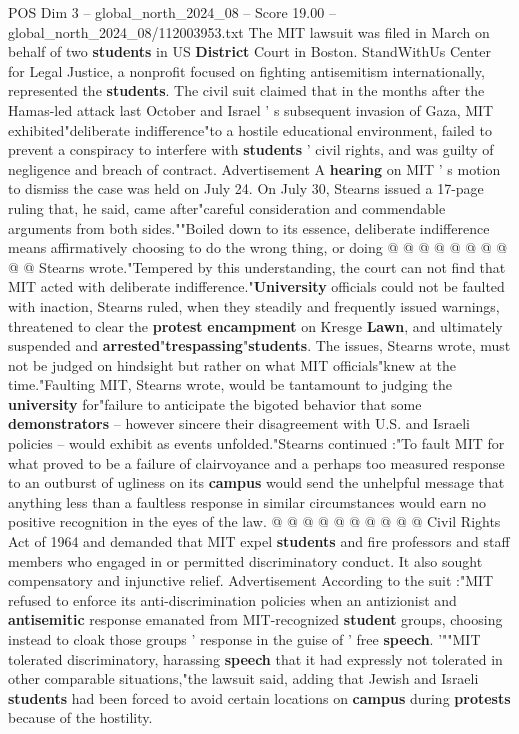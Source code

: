 \begin{textsample}{POS Dim 3 – global\_north\_2024\_08 – Score 19.00 – global\_north\_2024\_08/112003953.txt}
The MIT lawsuit was filed in March on behalf of two \textbf{students} in US \textbf{District} Court in Boston.
StandWithUs Center for Legal Justice, a nonprofit focused on fighting antisemitism internationally, represented the \textbf{students}.
The civil suit claimed that in the months after the Hamas-led attack last October and Israel ' s subsequent invasion of Gaza, MIT exhibited"deliberate indifference"to a hostile educational environment, failed to prevent a conspiracy to interfere with \textbf{students} ' civil rights, and was guilty of negligence and breach of contract.
Advertisement A \textbf{hearing} on MIT ' s motion to dismiss the case was held on July 24.
On July 30, Stearns issued a 17-page ruling that, he said, came after"careful consideration and commendable arguments from both sides.""Boiled down to its essence, deliberate indifference means affirmatively choosing to do the wrong thing, or doing @ @ @ @ @ @ @ @ @ @ Stearns wrote."Tempered by this understanding, the court can not find that MIT acted with deliberate indifference."\textbf{University} officials could not be faulted with inaction, Stearns ruled, when they steadily and frequently issued warnings, threatened to clear the \textbf{protest} \textbf{encampment} on Kresge \textbf{Lawn}, and ultimately suspended and \textbf{arrested}"\textbf{trespassing}"\textbf{students}.
The issues, Stearns wrote, must not be judged on hindsight but rather on what MIT officials"knew at the time."Faulting MIT, Stearns wrote, would be tantamount to judging the \textbf{university} for"failure to anticipate the bigoted behavior that some \textbf{demonstrators} -- however sincere their disagreement with U.S. and Israeli policies -- would exhibit as events unfolded."Stearns continued :"To fault MIT for what proved to be a failure of clairvoyance and a perhaps too measured response to an outburst of ugliness on its \textbf{campus} would send the unhelpful message that anything less than a faultless response in similar circumstances would earn no positive recognition in the eyes of the law. @ @ @ @ @ @ @ @ @ @ Civil Rights Act of 1964 and demanded that MIT expel \textbf{students} and fire professors and staff members who engaged in or permitted discriminatory conduct.
It also sought compensatory and injunctive relief.
Advertisement According to the suit :"MIT refused to enforce its anti-discrimination policies when an antizionist and \textbf{antisemitic} response emanated from MIT-recognized \textbf{student} groups, choosing instead to cloak those groups ' response in the guise of ' free \textbf{speech}. '""MIT tolerated discriminatory, harassing \textbf{speech} that it had expressly not tolerated in other comparable situations,"the lawsuit said, adding that Jewish and Israeli \textbf{students} had been forced to avoid certain locations on \textbf{campus} during \textbf{protests} because of the hostility.

\end{textsample}
